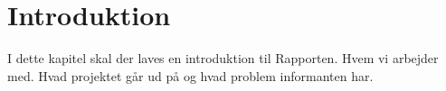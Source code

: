 \chapter{Introduktion}
I dette kapitel skal der laves en introduktion til Rapporten. Hvem vi arbejder med. Hvad projektet går ud på og hvad problem informanten har.
